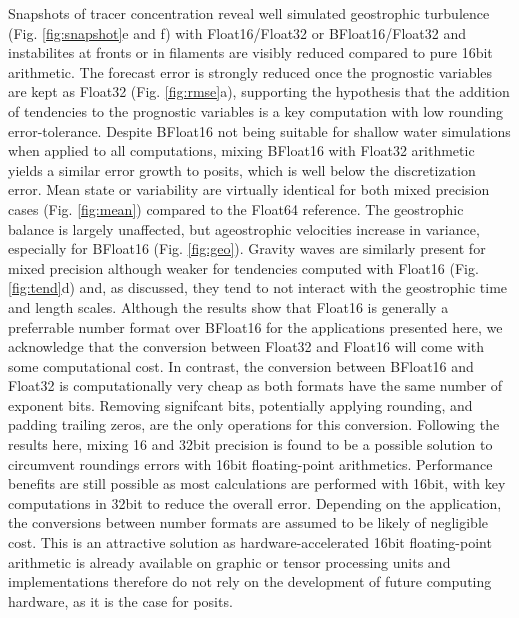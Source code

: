 \documentclass[draft]{agujournal2019}
\begin{document}
Snapshots of tracer concentration reveal well simulated geostrophic turbulence (Fig. \ref{fig:snapshot}e and f) with Float16/Float32 or BFloat16/Float32 and instabilites at fronts or in filaments are visibly reduced compared to pure 16bit arithmetic. The forecast error is strongly reduced once the prognostic variables are kept as Float32 (Fig. \ref{fig:rmse}a), supporting the hypothesis that the addition of tendencies to the prognostic variables is a key computation with low rounding error-tolerance. Despite BFloat16 not being suitable for shallow water simulations when applied to all computations, mixing BFloat16 with Float32 arithmetic yields a similar error growth to posits, which is well below the discretization error. Mean state or variability are virtually identical for both mixed precision cases (Fig. \ref{fig:mean}) compared to the Float64 reference. The geostrophic balance is largely unaffected, but ageostrophic velocities increase in variance, especially for BFloat16 (Fig. \ref{fig:geo}). Gravity waves are similarly present for mixed precision although weaker for tendencies computed with Float16 (Fig. \ref{fig:tend}d) and, as discussed, they tend to not interact with the geostrophic time and length scales. Although the results show that Float16 is generally a preferrable number format over BFloat16 for the applications presented here, we acknowledge that the conversion between Float32 and Float16 will come with some computational cost. In contrast, the conversion between BFloat16 and Float32 is computationally very cheap as both formats have the same number of exponent bits. Removing signifcant bits, potentially applying rounding, and padding trailing zeros, are the only operations for this conversion. Following the results here, mixing 16 and 32bit precision is found to be a possible solution to circumvent roundings errors with 16bit floating-point arithmetics. Performance benefits are still possible as most calculations are performed with 16bit, with key computations in 32bit to reduce the overall error. Depending on the application, the conversions between number formats are assumed to be likely of negligible cost. This is an attractive solution as hardware-accelerated 16bit floating-point arithmetic is already available on graphic or tensor processing units and implementations therefore do not rely on the development of future computing hardware, as it is the case for posits.
\end{document}
